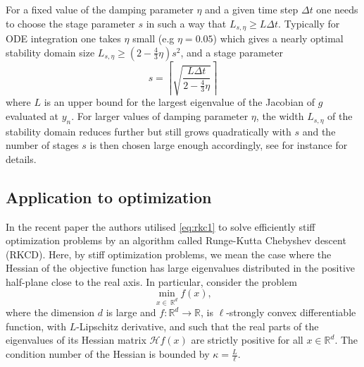 \documentclass[10pt,a4paper]{article}
\newcommand{\R}{\mathbb{R}}
\renewcommand{\R}{\mathbb{R}}
\begin{document}
{For a fixed value of the damping parameter $\eta$ and a given time step $\Delta t$ one needs to choose the stage parameter $s$ in such a way that $L_{s,\eta} \geq L \Delta t$.
Typically for ODE integration one takes $\eta$ small (e.g $\eta=0.05$) which gives a nearly optimal stability domain size $L_{s,\eta} \geq (2-\frac{4}{3}\eta)s^{2}$, and a stage parameter
\[
s=\left\lceil \sqrt{\frac{L \Delta t}{2-\frac{4}{3}\eta}}\right\rceil
\] where $L$ is an upper bound for the largest eigenvalue of the Jacobian of $g$ evaluated at $y_{n}$.
For larger values of damping parameter $\eta$, the width $L_{s,\eta}$ of the stability domain reduces further but still grows quadratically with $s$ and the number of stages $s$ is then chosen large enough accordingly, see  for instance \cite[Remark 6.1]{AAV18} for details.
}
\subsection{Application to optimization}


In the recent paper \cite{EVVZ21} the authors utilised \eqref{eq:rkc1} to solve efficiently stiff optimization problems by an algorithm called  Runge-Kutta Chebyshev descent {(RKCD)}.  Here, by stiff optimization problems, we mean the case where the Hessian of the objective function has large eigenvalues distributed in the positive half-plane close to the real axis. In particular, consider the problem 
	\begin{equation}\label{eq:min}
		\min_{x\in\ \R^d}f(x),
	\end{equation}
	where the dimension $d$ is large and $f:\R^d\to\R$,  is $\ell$-strongly convex differentiable function, with $L$-Lipschitz derivative, and such that the real parts of the eigenvalues of its Hessian matrix $\mathcal{H}f(x)$ are strictly positive for all $x\in\R^d$. The condition number of the Hessian is bounded by $\kappa=\frac{L}{\ell}$.
 
\end{document}
